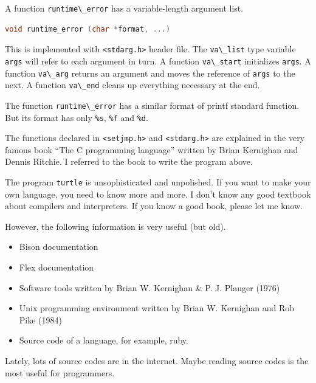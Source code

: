 A function \passthrough{\lstinline!runtime\_error!} has a
variable-length argument list.

\begin{lstlisting}[language=C]
void runtime_error (char *format, ...)
\end{lstlisting}

This is implemented with \passthrough{\lstinline!<stdarg.h>!} header
file. The \passthrough{\lstinline!va\_list!} type variable
\passthrough{\lstinline!args!} will refer to each argument in turn. A
function \passthrough{\lstinline!va\_start!} initializes
\passthrough{\lstinline!args!}. A function
\passthrough{\lstinline!va\_arg!} returns an argument and moves the
reference of \passthrough{\lstinline!args!} to the next. A function
\passthrough{\lstinline!va\_end!} cleans up everything necessary at the
end.

The function \passthrough{\lstinline!runtime\_error!} has a similar
format of printf standard function. But its format has only
\passthrough{\lstinline!\%s!}, \passthrough{\lstinline!\%f!} and
\passthrough{\lstinline!\%d!}.

The functions declared in \passthrough{\lstinline!<setjmp.h>!} and
\passthrough{\lstinline!<stdarg.h>!} are explained in the very famous
book ``The C programming language'' written by Brian Kernighan and
Dennis Ritchie. I referred to the book to write the program above.

The program \passthrough{\lstinline!turtle!} is unsophisticated and
unpolished. If you want to make your own language, you need to know more
and more. I don't know any good textbook about compilers and
interpreters. If you know a good book, please let me know.

However, the following information is very useful (but old).

\begin{itemize}
\tightlist
\item
  Bison documentation
\item
  Flex documentation
\item
  Software tools written by Brian W. Kernighan \& P. J. Plauger (1976)
\item
  Unix programming environment written by Brian W. Kernighan and Rob
  Pike (1984)
\item
  Source code of a language, for example, ruby.
\end{itemize}

Lately, lots of source codes are in the internet. Maybe reading source
codes is the most useful for programmers.

